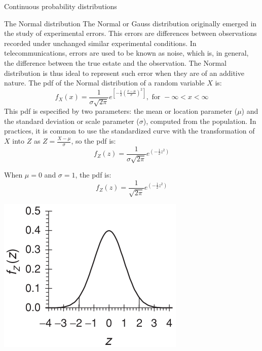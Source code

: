 \documentclass[8pt]{beamer}
\renewcommand{\emph}[1]{\textcolor{myorange}{#1}}
\begin{document}
\begin{frame}{Continuous probability distributions} 
    \begin{block}{The \alert{Normal} distribution}
The \alert{Normal or Gauss distribution} originally emerged in the study of \emph{experimental errors}. This errors are differences between observations recorded under unchanged similar experimental conditions. In telecommunications, errors are used to be known as \emph{noise}, which  is, in general, the difference between the true estate and the observation. The \alert{Normal distribution} is thus ideal to represent such error when they are of an additive nature. The \emph{pdf} of the \alert{Normal distribution} of a random variable $X$ is:
        \[
            f_X (x) = \frac{1}{\sigma \sqrt{2\pi}} e^{\left[-\frac{1}{2}\left( \frac{x-\mu}{\sigma} \right)^2 \right]}, \text{ for } -\infty < x < \infty
        \]
    This \emph{pdf} is especified by two parameters: the mean or location parameter ($\mu$) and the standard deviation or scale parameter ($\sigma$), computed from the population. In practices, it is common to use the standardized  curve with the transformation of $X$ into $Z$ as $Z=\frac{X-\mu}{\sigma}$, so the \emph{pdf} is:
\vspace{-6pt}
        \[
            f_Z (z) = \frac{1}{\sigma \sqrt{2\pi}} e^{\left(-\frac{1}{2}z^2 \right)}
        \]

\vspace{-20pt}
\begin{minipage}{0.59\textwidth}
        When $\mu=0$ and $\sigma=1$, the \emph{pdf} is:
\vspace{-6pt}
        \[
            f_Z (z) = \frac{1}{\sqrt{2\pi}} e^{\left(-\frac{1}{2}z^2 \right)}
        \]
\end{minipage}
\hfill
\begin{minipage}{0.39\textwidth}
\centering
\includegraphics[width=0.9\linewidth]{fi429.png}  %
\end{minipage}

    \end{block}
                
\end{frame}
\end{document}
